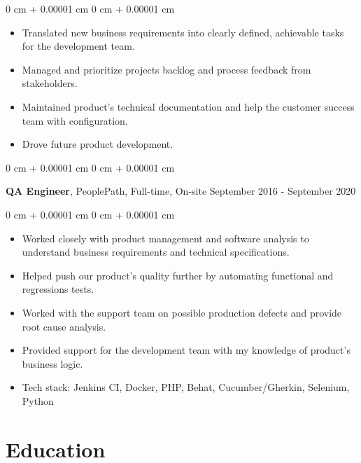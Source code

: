 \documentclass[10pt, letterpaper]{article}
\newenvironment{highlights}{
    \begin{itemize}[
        topsep=0.10 cm,
        parsep=0.10 cm,
        partopsep=0pt,
        itemsep=0pt,
        leftmargin=0 cm + 10pt
    ]
}{
    \end{itemize}
} %
\newenvironment{onecolentry}{
    \begin{adjustwidth}{
        0 cm + 0.00001 cm
    }{
        0 cm + 0.00001 cm
    }
}{
    \end{adjustwidth}
} %
\newenvironment{twocolentry}[2][]{
    \onecolentry
    \def\secondColumn{#2}
    \setcolumnwidth{\fill, 4.5 cm}
    \begin{paracol}{2}
}{
    \switchcolumn \raggedleft \secondColumn
    \end{paracol}
    \endonecolentry
} %
\begin{document}
        \vspace{0.10 cm}
        \begin{onecolentry}
            \begin{highlights}
                \item Translated new business requirements into clearly defined, achievable tasks for the development team.
                \item Managed and prioritize projects backlog and process feedback from stakeholders.
                \item Maintained product's technical documentation and help the customer success team with configuration.
                \item Drove future product development.
            \end{highlights}
        \end{onecolentry}

        \vspace{0.2 cm}

        \begin{twocolentry}{
            September 2016 - September 2020
        }
            \textbf{QA Engineer}, PeoplePath, Full-time, On-site\end{twocolentry}

        \vspace{0.10 cm}
        \begin{onecolentry}
            \begin{highlights}
                \item Worked closely with product management and software analysis to understand business requirements and technical specifications.
                \item Helped push our product's quality further by automating functional and regressions tests.
                \item Worked with the support team on possible production defects and provide root cause analysis.
                \item Provided support for the development team with my knowledge of product's business logic.
                \item Tech stack: Jenkins CI, Docker, PHP, Behat, Cucumber/Gherkin, Selenium, Python
            \end{highlights}
        \end{onecolentry}

    \section{Education}
\end{document}

